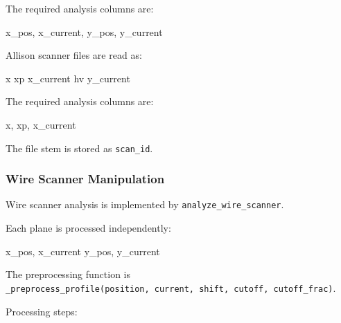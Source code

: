 \documentclass[
]{article}
\newenvironment{Shaded}{}{}
\newcommand{\NormalTok}[1]{#1}
\begin{document}
The required analysis columns are:

\begin{Shaded}
\begin{Highlighting}[]
\NormalTok{x\_pos, x\_current, y\_pos, y\_current}
\end{Highlighting}
\end{Shaded}

Allison scanner files are read as:

\begin{Shaded}
\begin{Highlighting}[]
\NormalTok{x xp x\_current hv y\_current}
\end{Highlighting}
\end{Shaded}

The required analysis columns are:

\begin{Shaded}
\begin{Highlighting}[]
\NormalTok{x, xp, x\_current}
\end{Highlighting}
\end{Shaded}

The file stem is stored as \texttt{scan\_id}.

\hypertarget{wire-scanner-manipulation}{%
\subsubsection{Wire Scanner
Manipulation}\label{wire-scanner-manipulation}}

Wire scanner analysis is implemented by \texttt{analyze\_wire\_scanner}.

Each plane is processed independently:

\begin{Shaded}
\begin{Highlighting}[]
\NormalTok{x\_pos, x\_current}
\NormalTok{y\_pos, y\_current}
\end{Highlighting}
\end{Shaded}

The preprocessing function is
\texttt{\_preprocess\_profile(position,\ current,\ shift,\ cutoff,\ cutoff\_frac)}.

Processing steps:
\end{document}
